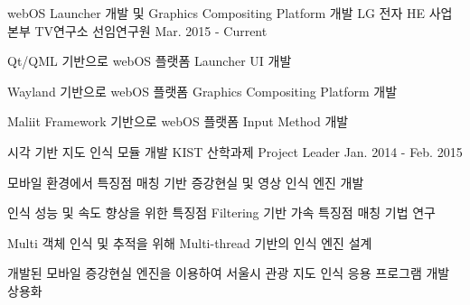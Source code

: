 


\begin{cventries}

  \cventry
    {webOS Launcher 개발 및 Graphics Compositing Platform 개발} %
    {LG 전자 HE 사업본부 TV연구소} %
    {선임연구원} %
    {Mar. 2015 - Current} %
    {
      \begin{cvitems} %
        \item {Qt/QML 기반으로 webOS 플랫폼 Launcher UI 개발}
        \item {Wayland 기반으로 webOS 플랫폼 Graphics Compositing Platform 개발}
        \item {Maliit Framework 기반으로 webOS 플랫폼 Input Method 개발}
      \end{cvitems}
    }

  \cventry
    {시각 기반 지도 인식 모듈 개발} %
    {KIST 산학과제} %
    {Project Leader} %
    {Jan. 2014 - Feb. 2015} %
    {
      \begin{cvitems} %
        \item {모바일 환경에서 특징점 매칭 기반 증강현실 및 영상 인식 엔진 개발}
        \item {인식 성능 및 속도 향상을 위한 특징점 Filtering 기반 가속 특징점 매칭 기법 연구}
        \item {Multi 객체 인식 및 추적을 위해 Multi-thread 기반의 인식 엔진 설계}
        \item {개발된 모바일 증강현실 엔진을 이용하여 서울시 관광 지도 인식 응용 프로그램 개발 상용화}
      \end{cvitems}
    }


\end{cventries}

